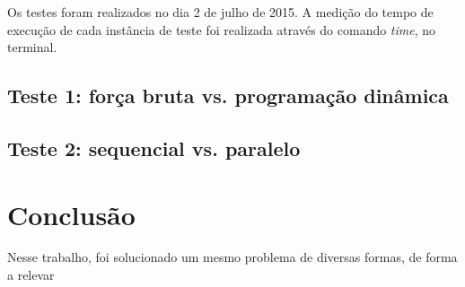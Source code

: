 \documentclass[10pt,a4paper]{article}
\numberwithin{equation}{section}
\begin{document}
Os testes foram realizados no dia 2 de julho de 2015. A medição do tempo de execução de cada instância de teste foi realizada através do comando \emph{time}, no terminal.

\subsection{Teste 1: força bruta vs. programação dinâmica}

\subsection{Teste 2: sequencial vs. paralelo}

\section{Conclusão}

Nesse trabalho, foi solucionado um mesmo problema de diversas formas, de forma a relevar 
\end{document}
